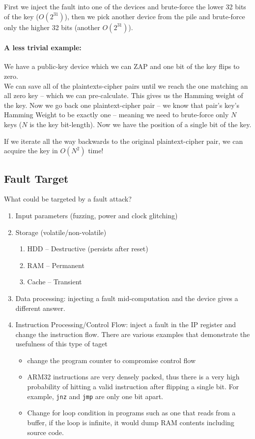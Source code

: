 First we inject the fault into one of the devices and brute-force the lower 32
bits of the key (\(O(2^{31})\)), then we pick another device from the pile and
brute-force only the higher 32 bits (another \(O(2^{31})\)).

\paragraph{A less trivial example:} We have a public-key device which we can ZAP
and one bit of the key flips to zero. \\
We can save all of the plaintexts-cipher pairs until we reach the one matching
an all zero key -- which we can pre-calculate. This gives us the Hamming weight
of the key. Now we go back one plaintext-cipher pair -- we know that pair's
key's Hamming Weight to be exactly one -- meaning we need to brute-force only
\(N\) keys (\(N\) is the key bit-length). Now we have the position of a single
bit of the key.

If we iterate all the way backwards to the original plaintext-cipher pair, we
can acquire the key in \(O(N^2)\) time!

\subsection{Fault Target}\label{subsec:fault_targets}
What could be targeted by a fault attack?
\begin{enumerate}
	\item Input parameters (fuzzing, power and clock glitching)
	\item Storage (volatile/non-volatile)
	\begin{enumerate}
		\item HDD -- Destructive (persists after reset)
		\item RAM -- Permanent
		\item Cache -- Transient
	\end{enumerate}
	\item Data processing: injecting a fault mid-computation and the device gives a
	different answer.
	\item Instruction Processing/Control Flow: inject a fault in the IP register
	and change the instruction flow. There are various examples that demonstrate
	the usefulness of this type of taget
	\begin{itemize}
		\item change the program counter to compromise control flow
		\item ARM32 instructions are very densely packed, thus there is a very
		high probability of hitting a valid instruction after flipping a single
		bit. For example, \texttt{jnz} and \texttt{jmp} are only one bit apart.
		\item Change for loop condition in programs such as one that
		reads from a buffer, if the loop is infinite, it would dump RAM contents
		including source code.
	\end{itemize}
\end{enumerate}

